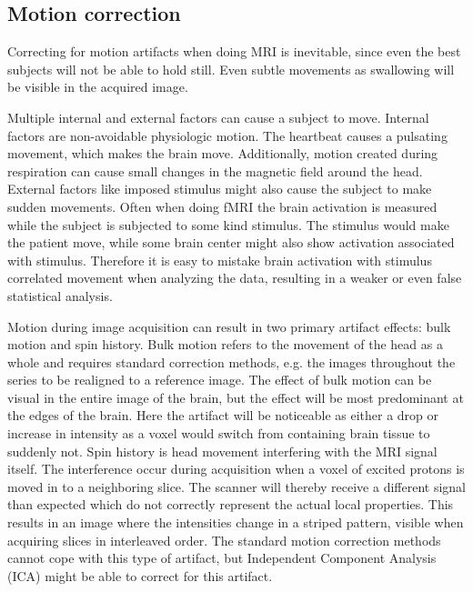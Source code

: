 \subsection{Motion correction}

Correcting for motion artifacts when doing MRI is inevitable, since even the best subjects will not be able to hold still. Even subtle movements as swallowing will be visible in the acquired image. \cite{Poldrack2011} 

Multiple internal and external factors can cause a subject to move. Internal factors are non-avoidable physiologic motion. The heartbeat causes a pulsating movement, which makes the brain move. Additionally, motion created during respiration can cause small changes in the magnetic field around the head. External factors like imposed stimulus might also cause the subject to make sudden movements. Often when doing fMRI the brain activation is measured while the subject is subjected to some kind stimulus. The stimulus would make the patient move, while some brain center might also show activation associated with stimulus. Therefore it is easy to mistake brain activation with stimulus correlated movement when analyzing the data, resulting in a weaker or even false statistical analysis. \cite{Poldrack2011} 

Motion during image acquisition can result in two primary artifact effects: bulk motion and spin history. Bulk motion refers to the movement of the head as a whole and requires standard correction methods, e.g. the images throughout the series to be realigned to a reference image. The effect of bulk motion can be visual in the entire image of the brain, but the effect will be most predominant at the edges of the brain. Here the artifact will be noticeable as either a drop or increase in intensity as a voxel would switch from containing brain tissue to suddenly not.  
Spin history is head movement interfering with the MRI signal itself. The interference occur during acquisition when a voxel of excited protons is moved in to a neighboring slice. The scanner will thereby receive a different signal than expected which do not correctly represent the actual local properties. This results in an image where the intensities change in a striped pattern, visible when acquiring slices in interleaved order. The standard motion correction methods cannot cope with this type of artifact, but Independent Component Analysis (ICA) might be able to correct for this artifact. \cite{Poldrack2011} 


